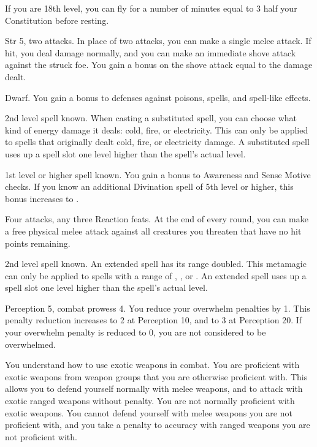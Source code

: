 If you are 18th level, you can fly for a number of minutes equal to 3 \add half your Constitution before resting.

\featpres Str 5, two attacks.
\featben In place of two attacks, you can make a single melee attack.
If hit, you deal damage normally, and you can make an immediate shove attack against the struck foe.
You gain a bonus on the shove attack equal to the damage dealt.

\featpre Dwarf.
\featben You gain a  bonus to defenses against poisons, spells, and spell-like effects.

\featpre 2nd level spell known.
\featben When casting a substituted spell, you can choose what kind of energy damage it deals: cold, fire, or electricity.
This can only be applied to spells that originally dealt cold, fire, or electricity damage.
A substituted spell uses up a spell slot one level higher than the spell's actual level.

\featpre 1st level or higher  spell known.
\featben You gain a  bonus to Awareness and Sense Motive checks.
If you know an additional Divination spell of 5th level or higher, this bonus increases to .

\featpres Four attacks, any three Reaction feats.
\featben At the end of every round, you can make a free physical melee attack against all creatures you threaten that have no hit points remaining.

\featpre 2nd level spell known.
\featben An extended spell has its range doubled.
This metamagic can only be applied to spells with a range of \rngclose, \rngmed, or \rnglong.
An extended spell uses up a spell slot one level higher than the spell's actual level.

\featpre Perception 5, combat prowess 4.
\featben You reduce your overwhelm penalties by 1.
This penalty reduction increases to 2 at Perception 10, and to 3 at Perception 20.
If your overwhelm penalty is reduced to 0, you are not considered to be overwhelmed.

You understand how to use exotic weapons in combat.
\featben You are proficient with exotic weapons from weapon groups that you are otherwise proficient with.
This allows you to defend yourself normally with melee weapons, and to attack with exotic ranged weapons without penalty.
You are not normally proficient with exotic weapons.
You cannot defend yourself with melee weapons you are not proficient with, and you take a  penalty to accuracy with ranged weapons you are not proficient with.

